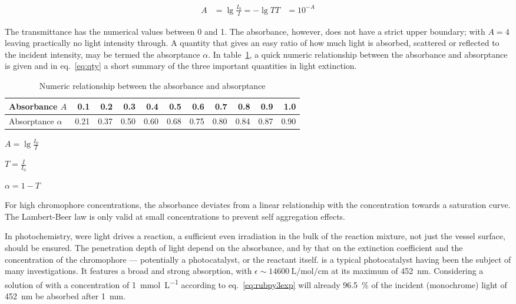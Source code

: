 			\begin{equation}
			\begin{split}
				A &= \lg\frac{I_0}{I} = -\lg T
				T &= 10^{-A}
			\end{split}
			\end{equation}

			The transmittance has the numerical values between 0 and 1. The absorbance, however, does not have a strict upper boundary; with $A = 4$ leaving practically no light intensity through. A quantity that gives an easy ratio of how much light is absorbed, scattered or reflected to the incident intensity, may be termed the absorptance $\alpha$. In table~\ref{tab:absorptance}, a quick numeric relationship between the absorbance and absorptance is given and in eq.~\ref{eq:qty} a short summary of the three important quantities in light extinction.

			\begin{table}[h]
			\label{tab:absorptance}
			\caption{Numeric relationship between the absorbance and absorptance}
			\begin{tabular}{%
				@{}l|rrrrrrrrrr@{}
			}
				Absorbance $A$		& 0.1 & 0.2 & 0.3 & 0.4 & 0.5 & 0.6 & 0.7 & 0.8 & 0.9 & 1.0 \\
				\midrule
				Absorptance $\alpha$& 0.21 & 0.37 & 0.50 & 0.60 & 0.68 & 0.75 & 0.80 & 0.84 & 0.87 & 0.90 

			\end{tabular}
			\end{table}

			\begin{description}
			\label{lst:qty}
				\item[Absorbance]$A = \lg\frac{I_0}{I}$ \\
				\item[Transmittance]$T = \frac{I}{I_0}$ \\
				\item[Absorptance]$\alpha = 1 - T$
			\end{description}

			For high chromophore concentrations, the absorbance deviates from a linear relationship with the concentration towards a saturation curve. The Lambert-Beer law is only valid at small concentrations to prevent self aggregation effects. 

			In photochemistry, were light drives a reaction, a sufficient even irradiation in the bulk of the reaction mixture, not just the vessel surface, should be ensured. The penetration depth of light depend on the absorbance, and by that on the extinction coefficient and the concentration of the chromophore --- potentially a photocatalyst, or the reactant itself.  is a typical photocatalyst having been the subject of many investigations. It features a broad and strong absorption, with $\epsilon\sim \qty{14600}{\L\per\mol\per\cm}$ at its maximum of \qty{452}{\nm}. Considering a solution of  with a concentration of \qty{1}{\milli\mol\per\L} according to eq.~\ref{eq:rubpy3exp} will already \qty{96.5}{\percent} of the incident (monochrome) light of \qty{452}{\nm} be absorbed after \qty{1}{\mm}. 

